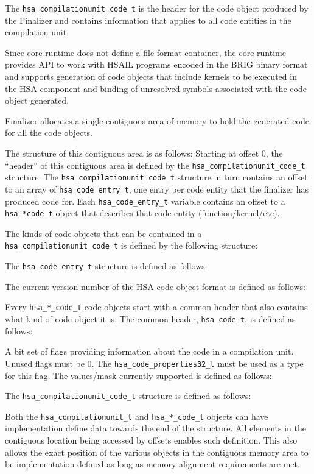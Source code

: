 \documentclass{book}
\begin{document}
\begin{appendices}
The \texttt{hsa\_compilationunit\_code\_t} is the header for the
code object produced by the Finalizer and contains information that
applies to all code entities in the compilation unit.

Since core runtime does not define a file format container, the core
runtime provides API to work with HSAIL programs encoded in the BRIG
binary format and supports generation of code objects that
include kernels to be executed in the HSA component and binding
of unresolved symbols associated with the code object
generated.

Finalizer allocates a single contiguous area of memory to hold the
generated code for all the code objects.

The structure of this contiguous area is as follows: Starting at
offset 0, the ``header'' of this contiguous area is defined by the
\texttt{hsa\_compilationunit\_code\_t} structure. The
\texttt{hsa\_compilationunit\_code\_t} structure in turn contains
an offset to an array of \texttt{hsa\_code\_entry\_t}, one entry per
code entity that the finalizer has produced code for. Each
\texttt{hsa\_code\_entry\_t} variable contains an offset to a
\texttt{hsa\_*code\_t} object that describes that code entity
(function/kernel/etc).

The kinds of code objects that can be contained in a
\texttt{hsa\_compilationunit\_code\_t} is defined by the following
structure:


The \texttt{hsa\_code\_entry\_t} structure is defined as follows:


The current version number of the HSA code object
format is defined as follows:



Every \texttt{hsa\_*\_code\_t} code objects start with a common
header that also contains what kind of code object it is. The common
header, \texttt{hsa\_code\_t}, is defined as follows:


A bit set of flags providing information about the code in a
compilation unit. Unused flags must be 0. The
\texttt{hsa\_code\_properties32\_t} must be used as a type for this
flag. The values/mask currently supported is defined as follows:


The \texttt{hsa\_compilationunit\_code\_t} structure is defined as
follows:


Both the \texttt{hsa\_compilationunit\_t} and
\texttt{hsa\_*\_code\_t} objects can have implementation define data
towards the end of the structure. All elements in the contiguous
location being accessed by offsets enables such definition.  This
also allows the exact position of the various objects in the
contiguous memory area to be implementation defined as long as
memory alignment requirements are met.


\end{appendices}
\end{document}
